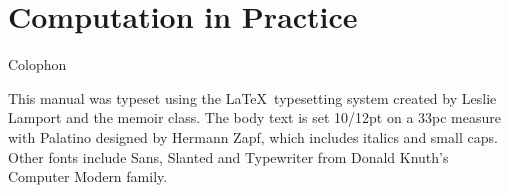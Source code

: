 \documentclass[letterpaper,10pt,extrafontsizesmtwoside,onecolumn,openright,fleqn]{memoir}
\begin{document}









\part{Computation in Practice}







\backmatter

\printindex

\cleardoublepage
\pagestyle{empty}
\null\vfil

\begin{adjustwidth}{1in}{1in}
\begin{center}
{\Large\textsf{Colophon}}
\end{center}
\begin{center}
This manual was typeset using the \LaTeX\ typesetting system
created by Leslie Lamport and the memoir class.
The body text is set 10/12pt on a
33pc measure with Palatino designed by Hermann Zapf, which includes
italics and small caps. Other fonts include
Sans, Slanted and Typewriter from Donald Knuth's
Computer Modern family.

\end{center}

\end{adjustwidth}

\vfil
\end{document}
